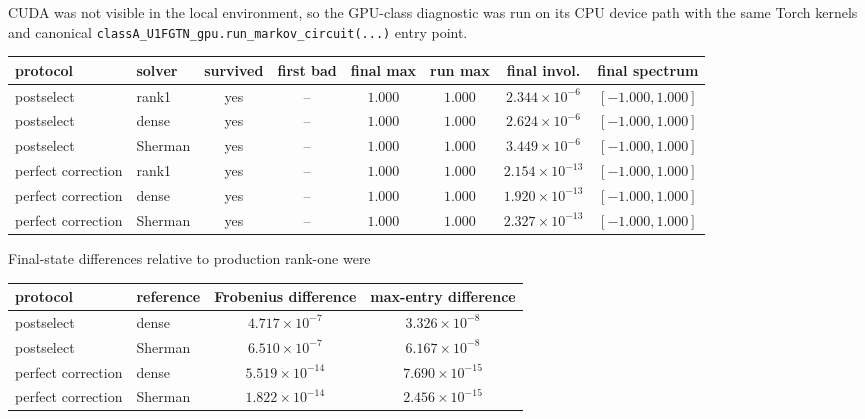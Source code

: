 \documentclass[aps,prb,onecolumn,nofootinbib,superscriptaddress]{revtex4-2}
\begin{document}
CUDA was not visible in the local environment, so the GPU-class diagnostic was
run on its CPU device path with the same Torch kernels and canonical
\texttt{classA\_U1FGTN\_gpu.run\_markov\_circuit(...)} entry point.

\begin{center}
\begin{tabular}{llcccccc}
\toprule
protocol & solver & survived & first bad & final max & run max & final invol. & final spectrum\\
\midrule
postselect & rank1 & yes & -- & \(1.000\) & \(1.000\) & \(2.344\times10^{-6}\) & \([-1.000,1.000]\)\\
postselect & dense & yes & -- & \(1.000\) & \(1.000\) & \(2.624\times10^{-6}\) & \([-1.000,1.000]\)\\
postselect & Sherman & yes & -- & \(1.000\) & \(1.000\) & \(3.449\times10^{-6}\) & \([-1.000,1.000]\)\\
perfect correction & rank1 & yes & -- & \(1.000\) & \(1.000\) & \(2.154\times10^{-13}\) & \([-1.000,1.000]\)\\
perfect correction & dense & yes & -- & \(1.000\) & \(1.000\) & \(1.920\times10^{-13}\) & \([-1.000,1.000]\)\\
perfect correction & Sherman & yes & -- & \(1.000\) & \(1.000\) & \(2.327\times10^{-13}\) & \([-1.000,1.000]\)\\
\bottomrule
\end{tabular}
\end{center}

Final-state differences relative to production rank-one were
\begin{center}
\begin{tabular}{llcc}
\toprule
protocol & reference & Frobenius difference & max-entry difference\\
\midrule
postselect & dense & \(4.717\times10^{-7}\) & \(3.326\times10^{-8}\)\\
postselect & Sherman & \(6.510\times10^{-7}\) & \(6.167\times10^{-8}\)\\
perfect correction & dense & \(5.519\times10^{-14}\) & \(7.690\times10^{-15}\)\\
perfect correction & Sherman & \(1.822\times10^{-14}\) & \(2.456\times10^{-15}\)\\
\bottomrule
\end{tabular}
\end{center}
\end{document}
